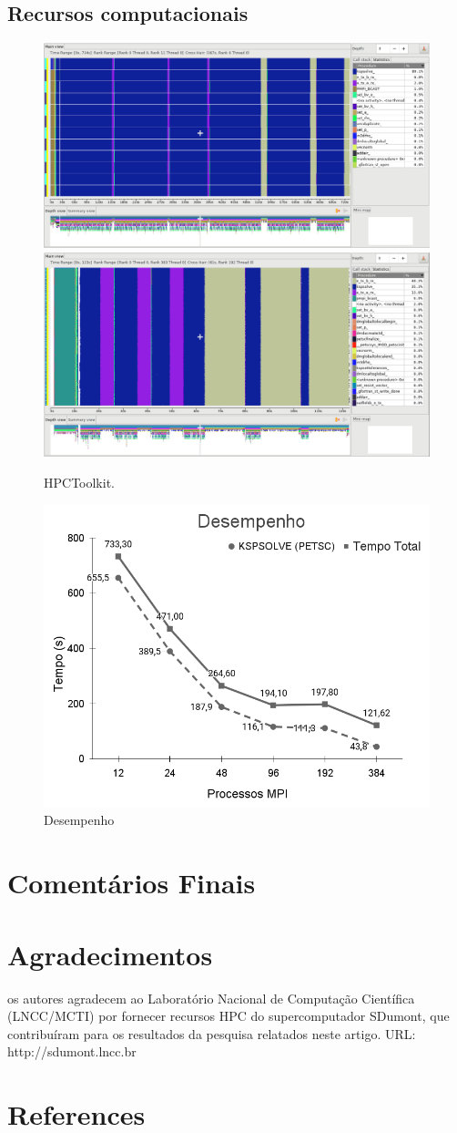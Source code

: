 \documentclass[12pt]{article}
\begin{document}
\subsection{Recursos computacionais}
\begin{figure}
\centering
\includegraphics[width=.5\textwidth]{figures/openmpi/Nodes1_MPI12.png}\includegraphics[width=.5\textwidth]{figures/openmpi/Nodes16_MPI384.png}
\caption{HPCToolkit.}
\label{fig:nodes1mpi12}
\end{figure}


\begin{figure}
\centering
\includegraphics[width=.5\textwidth]{figures/openmpi/desempenho.png}
\caption{Desempenho}
\label{fig:desempenho}
\end{figure}




\section{Comentários Finais}


\section{Agradecimentos}
os autores agradecem ao Laboratório Nacional de Computação Científica (LNCC/MCTI) por fornecer recursos HPC do supercomputador SDumont, que contribuíram para os resultados da pesquisa relatados neste artigo. URL: http://sdumont.lncc.br
\section{References}



\end{document}
